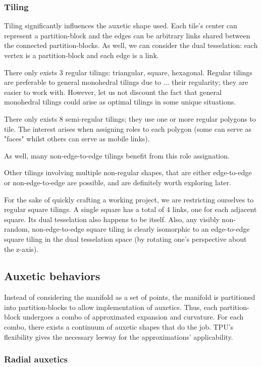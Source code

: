 \documentclass{article}
\begin{document}
\subsubsection{Tiling}
Tiling significantly influences the auxetic shape used. Each tile's center can represent a partition-block and the edges can be arbitrary links shared between the connected partition-blocks. As well, we can consider the dual tesselation: each vertex is a partition-block and each edge is a link.

There only exists 3 regular tilings: triangular, square, hexagonal. Regular tilings are preferable to general monohedral tilings due to ... their regularity; they are easier to work with. However, let us not discount the fact that general monohedral tilings could arise as optimal tilings in some unique situations.

There only exists 8 semi-regular tilings; they use one or more regular polygons to tile. The interest arises when assigning roles to each polygon (some can serve as "faces" whilst others can serve as mobile links).

As well, many non-edge-to-edge tilings benefit from this role assignation.

Other tilings involving multiple non-regular shapes, that are either edge-to-edge or non-edge-to-edge are possible, and are definitely worth exploring later.

For the sake of quickly crafting a working project, we are restricting ourselves to regular square tilings. A single square has a total of 4 links, one for each adjacent square. Its dual tesselation also happens to be itself. Also, any visibly non-random, non-edge-to-edge square tiling is clearly isomorphic to an edge-to-edge square tiling in the dual tesselation space (by rotating one's perspective about the z-axis).

\subsection{Auxetic behaviors}
Instead of considering the manifold as a set of points, the manifold is partitioned into partition-blocks to allow implementation of auxetics. Thus, each partition-block undergoes a combo of approximated expansion and curvature. For each combo, there exists a continuum of auxetic shapes that do the job. TPU's flexibility gives the necessary leeway for the approximations' applicability.

\subsubsection{Radial auxetics}
\end{document}
